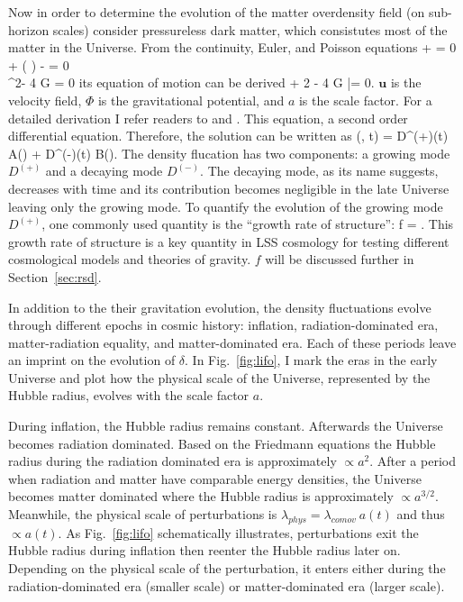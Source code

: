 Now in order to determine the evolution of the matter overdensity field
(on sub-horizon scales) consider pressureless dark matter, which consistutes 
most of the matter in the Universe. From the continuity, Euler, and Poisson equations
\beqa 
{} + \nabla \cdot \rho \;  = 0  \\ 
 + ( \cdot \nabla) \cdot {} - \nabla\Phi = 0 \\ 
\nabla^2\Phi - 4 \pi G \rho = 0 
\eeqa
its equation of motion can be derived
\beq \label{eq:meszaros}
 + 2   - 4 \pi G \bar{\rho}\;\delta = 0.
\eeq
$\bm{u}$ is the velocity field, $\Phi$ is the gravitational potential, and $a$ 
is the scale factor. For a detailed derivation I refer readers to 
\cite{peebles80} and \cite{DodelsonBook}. This equation, a second order differential 
equation. Therefore, the solution can be written as 
\beq 
\delta(, t) = D^{(+)}(t) A() + D^{(-)}(t) B().
\eeq
The density flucation has two components: a growing mode $D^{(+)}$ and a decaying 
mode $D^{(-)}$. The decaying mode, as its name suggests, decreases with time 
and its contribution becomes negligible in the late Universe leaving only the 
growing mode. To quantify the evolution of the growing mode $D^{(+)}$, one 
commonly used quantity is the ``growth rate of structure'': 
\beq \label{eq:f_growth}
f = . 
\eeq
This growth rate of structure is a key quantity in LSS cosmology for testing different 
cosmological models and theories of gravity. $f$ will be discussed further in 
Section~\ref{sec:rsd}.

In addition to the their gravitation evolution, the density fluctuations 
evolve through different epochs in cosmic history: inflation, 
radiation-dominated era, matter-radiation equality, and matter-dominated era. Each of 
these periods leave an imprint on the evolution of $\delta$. In Fig.~\ref{fig:lifo}, 
I mark the eras in the early Universe and plot how the physical scale of 
the Universe, represented by the Hubble radius, evolves with the scale factor $a$. 

During inflation, the Hubble radius remains constant. Afterwards the Universe 
becomes radiation dominated. Based on the Friedmann equations the Hubble radius 
during the radiation dominated era is approximately $\propto a^{2}$. After a period 
when radiation and matter have comparable energy densities, the Universe 
becomes matter dominated where the Hubble radius is approximately $\propto a^{3/2}$. 
Meanwhile, the physical scale of perturbations is $\lambda_{phys} = \lambda_{comov}\ a(t)$ 
and thus $\propto a(t)$. As Fig.~\ref{fig:lifo} schematically illustrates, 
perturbations exit the Hubble radius during inflation then 
reenter the Hubble radius later on. 
Depending on the physical scale of the perturbation, it enters either
during the radiation-dominated era (smaller scale) or matter-dominated era (larger scale). 

